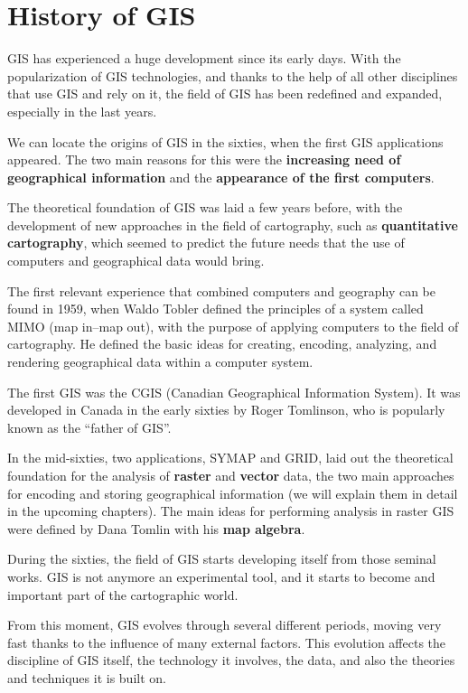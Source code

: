 
\chapter{History of GIS}


\pagestyle{fancy}

GIS has experienced a huge development since its early days. With the popularization of GIS technologies, and thanks to the help of all other disciplines that use GIS and rely on it, the field of GIS has been redefined and expanded, especially in the last years.

We can locate the origins of GIS in the sixties, when the first GIS applications appeared. The two main reasons for this were the \textbf{increasing need of geographical information} and the \textbf{appearance of the first computers}.

The theoretical foundation of GIS was laid a few years before, with the development of new approaches in the field of cartography, such as \textbf{quantitative cartography}, which seemed to predict the future needs that the use of computers and geographical data would bring.

The first relevant experience that combined computers and geography can be found in 1959, when Waldo Tobler defined the principles of a system called MIMO (map in--map out), with the purpose of applying computers to the field of cartography. He defined the basic ideas for creating, encoding, analyzing, and rendering geographical data within a computer system.

The first GIS was the CGIS (Canadian Geographical Information System). It was developed in Canada in the early sixties by Roger Tomlinson, who is popularly known as the ``father of GIS''.

In the mid-sixties, two applications, SYMAP and GRID, laid out the theoretical foundation for the analysis of \textbf{raster} and \textbf{vector} data, the two main approaches for encoding and storing geographical information (we will explain them in detail in the upcoming chapters). The main ideas for performing analysis in raster GIS were defined by Dana Tomlin with his \textbf{map algebra}.

During the sixties, the field of GIS starts developing itself from those seminal works. GIS is not anymore an experimental tool, and it starts to become and important part of the cartographic world.

From this moment, GIS evolves through several different periods, moving very fast thanks to the influence of many external factors. This evolution affects the discipline of GIS itself, the technology it involves, the data, and also the theories and techniques it is built on.


